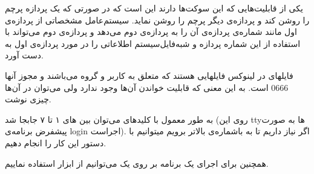 یکی از قابلیت‌هایی که این سوکت‌ها دارند این است که در صورتی که یک پردازه پرچم  را روشن کند و پردازه‌ی دیگر پرچم  را روشن نماید. سیستم‌عامل مشخصاتی از پردازه‌ی اول مانند شماره‌ی پردازه‌ی آن را به پردازه‌ی دوم می‌دهد و پردازه‌ی دوم می‌تواند با استفاده از این شماره پردازه و شبه‌فایل‌سیستم  اطلاعاتی را در مورد پردازه‌ی اول به دست آورد.


فایلهای  در لینوکس فایلهایی هستند که متعلق به کاربر  و گروه  می‌باشند و مجوز آنها 0666 است. به این معنی که قابلیت خواندن آن‌ها وجود ندارد ولی می‌توان در آن‌ها چیزی نوشت. 

به طور معمول با کلید‌های  می‌توان بین های ۱ تا ۷ جابجا شد (روی این ttyها به صورت پیشفرض برنامه‌ی login اجراست). اگر نیاز داریم تا به  باشماره‌ی بالاتر برویم میتوانیم با دستور  این کار را انجام دهیم.

همچنین برای اجرای یک برنامه بر روی یک  می‌توانیم از ابزار  استفاده نماییم.
